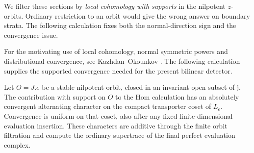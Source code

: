 We filter these sections by \emph{local cohomology with supports} in the
nilpotent $z$-orbits.  Ordinary restriction to an orbit would give the wrong
answer on boundary strata.  The following calculation fixes both the
normal-direction sign and the convergence issue.

For the motivating use of local cohomology, normal symmetric powers and
distributional convergence, see Kazhdan--Okounkov
\cite[Sections~2.6.1--2.6.4, equations~(107)--(111)]{KazhdanOkounkov}.
The following calculation supplies the supported convergence needed for
the present bilinear detector.

\begin{lemma}\label{meas:supported-convergence}
Let $O=J.e$ be a stable nilpotent orbit, closed in an invariant open subset
of $\mathfrak j$.  The contribution with support on $O$ to the Hom
calculation has an absolutely convergent alternating character on the
compact transporter coset of $L_e$.  Convergence is uniform on that coset,
also after any fixed finite-dimensional evaluation insertion.  These
characters are additive through the finite orbit filtration and compute
the ordinary supertrace of the final perfect evaluation complex.
\end{lemma}

